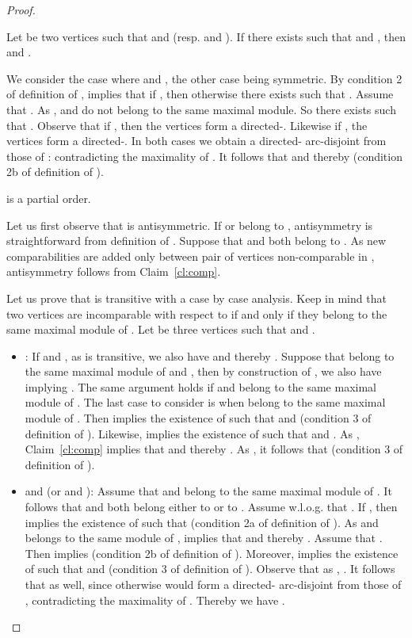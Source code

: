 \begin{proof}
\begin{claim} \label{cl:transitive}
Let  be two vertices such that  and  (resp.  and ). If there exists  such that  and , then  and .
\end{claim}
\begin{proofclaim}
We consider the case where  and , the other case being symmetric.
By condition 2 of definition of ,  implies that if , then  otherwise there exists  such that . Assume that . As ,  and  do not belong to the same maximal module. So there exists  such that . Observe that if , then the vertices  form a directed-. Likewise if , the vertices  form a directed-. In both cases we obtain a directed- arc-disjoint from those of : contradicting the maximality of . It follows that  and thereby  (condition 2b of definition of ).
\end{proofclaim}


\begin{claim} \label{cl:PO}
 is a partial order. 
\end{claim}
\begin{proofclaim}
Let us first observe that  is antisymmetric. If  or  belong to , antisymmetry is straightforward from definition of . Suppose that  and  both belong to . As new comparabilities are added only between pair of vertices non-comparable in , antisymmetry follows from Claim~\ref{cl:comp}. 

Let us prove that  is transitive with a case by case analysis.  Keep in mind that two vertices are incomparable with respect to  if and only if they belong to the same maximal module of . Let  be three vertices such that  and .
\begin{itemize}
\item : If  and , as  is transitive, we also have  and thereby . Suppose that  belong to the same maximal module of  and , then by construction of , we also have  implying . The same argument holds if   and  belong to the same maximal module of . The last case to consider is when  belong to the same maximal module of . Then  implies the existence of  such that  and  (condition 3 of definition of ). Likewise,  implies the existence of  such that  and . As , Claim~\ref{cl:comp} implies that  and thereby . As , it follows that  (condition 3 of definition of ).


\item  and  (or  and ): Assume that  and  belong to the same maximal module of . 
It follows that  and  both belong either to  or to . Assume w.l.o.g. that .
If , then  implies the existence of  such that  (condition 2a of definition of ). As  and  belongs to the same module of ,  implies that  and thereby . Assume that . Then  implies  (condition 2b of definition of ). Moreover,  implies the existence of  such that  and  (condition 3 of definition of ). Observe that as , . It follows that  as well, 
since otherwise  would form a directed- arc-disjoint from those of , contradicting the maximality of . Thereby we have .


\end{itemize}
\end{proofclaim}
\end{proof}
